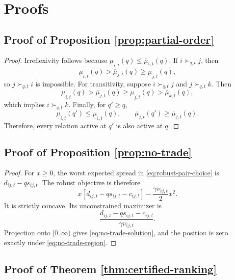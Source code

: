 \section{Proofs}

\subsection{Proof of Proposition \ref{prop:partial-order}}

\begin{proof}
Irreflexivity follows because $\underline\mu_{i,t}(q)\leq\overline\mu_{i,t}(q)$. If $i\succ_{q,t}j$, then
\[
\underline\mu_{i,t}(q)
>
\overline\mu_{j,t}(q)
\geq
\underline\mu_{j,t}(q),
\]
so $j\succ_{q,t}i$ is impossible. For transitivity, suppose $i\succ_{q,t}j$ and $j\succ_{q,t}k$. Then
\[
\underline\mu_{i,t}(q)
>
\overline\mu_{j,t}(q)
\geq
\underline\mu_{j,t}(q)
>
\overline\mu_{k,t}(q),
\]
which implies $i\succ_{q,t}k$. Finally, for $q'\geq q$,
\[
\underline\mu_{i,t}(q')
\leq
\underline\mu_{i,t}(q),
\qquad
\overline\mu_{j,t}(q')
\geq
\overline\mu_{j,t}(q).
\]
Therefore, every relation active at $q'$ is also active at $q$.
\end{proof}

\subsection{Proof of Proposition \ref{prop:no-trade}}

\begin{proof}
For $x\geq0$, the worst expected spread in \eqref{eq:robust-pair-choice} is $d_{ij,t}-q s_{ij,t}$. The robust objective is therefore
\[
x[d_{ij,t}-q s_{ij,t}-c_{ij,t}]
-
\frac{\gamma\nu_{ij,t}}{2}x^2.
\]
It is strictly concave. Its unconstrained maximizer is
\[
\frac{d_{ij,t}-q s_{ij,t}-c_{ij,t}}
{\gamma\nu_{ij,t}}.
\]
Projection onto $[0,\infty)$ gives \eqref{eq:no-trade-solution}, and the position is zero exactly under \eqref{eq:no-trade-region}.
\end{proof}

\subsection{Proof of Theorem \ref{thm:certified-ranking}}


